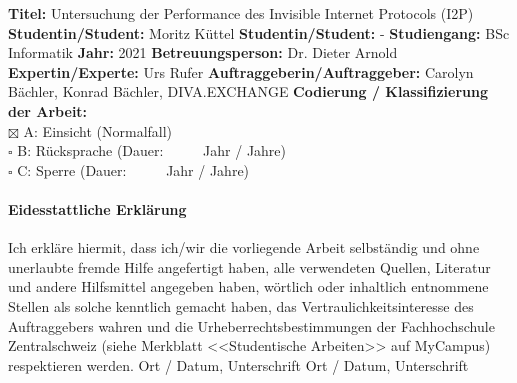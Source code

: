 \fontsize{10.5}{12}
\noindent
\textbf{Titel:} Untersuchung der Performance des Invisible Internet Protocols (I2P)\newline \newline
\textbf{Studentin/Student:} Moritz Küttel \newline \newline
\textbf{Studentin/Student:} - \newline \newline
\textbf{Studiengang:} BSc Informatik \newline \newline
\textbf{Jahr:} 2021\newline \newline
\textbf{Betreuungsperson:} Dr. Dieter Arnold \newline \newline
\textbf{Expertin/Experte:} Urs Rufer \newline \newline
\textbf{Auftraggeberin/Auftraggeber:} Carolyn Bächler, Konrad Bächler, DIVA.EXCHANGE\newline \newline \newline
\textbf{Codierung / Klassifizierung der Arbeit:}\\
$\boxtimes$ A: Einsicht   (Normalfall) \\
$\square$ B: R\"ucksprache      (Dauer:  \ \ \ \ \     Jahr / Jahre)\\
$\square$ C: Sperre     (Dauer:  \ \ \ \ \     Jahr / Jahre)\\

\paragraph{\textbf{Eidesstattliche Erkl\"arung}}
Ich erkl\"are hiermit, dass ich/wir die vorliegende Arbeit selbst\"andig und ohne unerlaubte fremde Hilfe angefertigt haben, alle verwendeten Quellen, Literatur und andere Hilfsmittel angegeben haben, w\"ortlich oder inhaltlich entnommene Stellen als solche kenntlich gemacht haben, das Vertraulichkeitsinteresse des Auftraggebers wahren und die Urheberrechtsbestimmungen der Fachhochschule Zentralschweiz (siehe Merkblatt <<Studentische Arbeiten>> auf MyCampus) respektieren werden. \newline \newline
Ort / Datum, Unterschrift       \underline{\hspace*{4cm}} \newline \newline
Ort / Datum, Unterschrift       \underline{\hspace*{4cm}}


